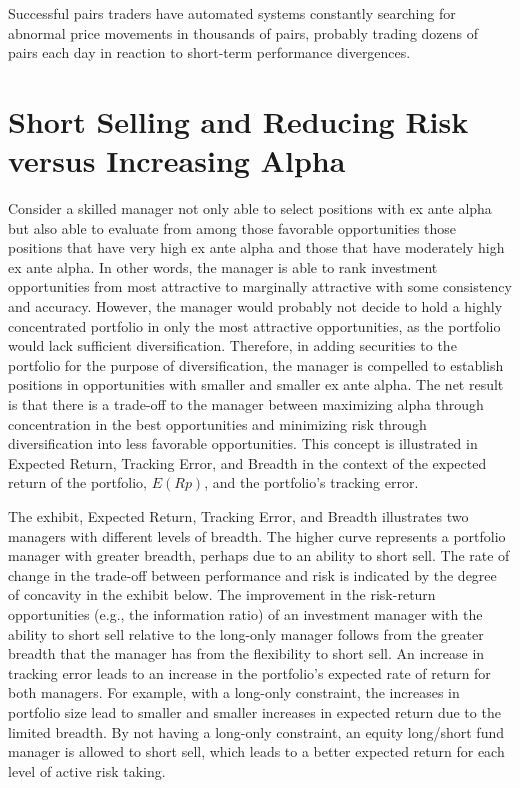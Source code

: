 \documentclass[11pt]{article}
\begin{document}
Successful pairs traders have automated systems constantly searching for abnormal price movements in thousands of pairs, probably trading dozens of pairs each day in reaction to short-term performance divergences.

\section*{Short Selling and Reducing Risk versus Increasing Alpha}
Consider a skilled manager not only able to select positions with ex ante alpha but also able to evaluate from among those favorable opportunities those positions that have very high ex ante alpha and those that have moderately high ex ante alpha. In other words, the manager is able to rank investment opportunities from most attractive to marginally attractive with some consistency and accuracy. However, the manager would probably not decide to hold a highly concentrated portfolio in only the most attractive opportunities, as the portfolio would lack sufficient diversification. Therefore, in adding securities to the portfolio for the purpose of diversification, the manager is compelled to establish positions in opportunities with smaller and smaller ex ante alpha. The net result is that there is a trade-off to the manager between maximizing alpha through concentration in the best opportunities and minimizing risk through diversification into less favorable opportunities. This concept is illustrated in Expected Return, Tracking Error, and Breadth in the context of the expected return of the portfolio, $E(R p)$, and the portfolio's tracking error.

The exhibit, Expected Return, Tracking Error, and Breadth illustrates two managers with different levels of breadth. The higher curve represents a portfolio manager with greater breadth, perhaps due to an ability to short sell. The rate of change in the trade-off between performance and risk is indicated by the degree of concavity in the exhibit below. The improvement in the risk-return opportunities (e.g., the information ratio) of an investment manager with the ability to short sell relative to the long-only manager follows from the greater breadth that the manager has from the flexibility to short sell. An increase in tracking error leads to an increase in the portfolio's expected rate of return for both managers. For example, with a long-only constraint, the increases in portfolio size lead to smaller and smaller increases in expected return due to the limited breadth. By not having a long-only constraint, an equity long/short fund manager is allowed to short sell, which leads to a better expected return for each level of active risk taking.
\end{document}
